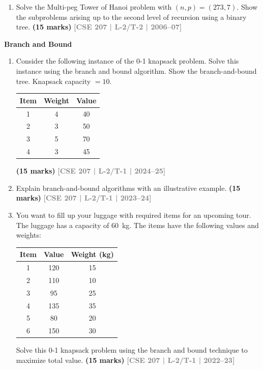 \documentclass[12pt,a3paper]{article}
\newcommand{\yr}[1]{\hfill\textcolor{gray}{\small\textbf{[#1]}}}
\newcommand{\mk}[1]{\textcolor{orange!70!black}{\small\textbf{(#1 marks)}}}
\newcommand{\subtopic}[2]{%
  \vspace{10pt}
  \noindent\begin{tcolorbox}[colback=#1!8,colframe=#1,boxrule=0.6pt,arc=4pt,
    left=6pt,right=6pt,top=4pt,bottom=4pt]
    \small\bfseries\textcolor{#1}{#2}
  \end{tcolorbox}
  \vspace{2pt}
}
\begin{document}
\begin{enumerate}
\item Solve the Multi-peg Tower of Hanoi problem with $(n, p) = (273, 7)$. Show the subproblems arising up to the second level of recursion using a binary tree. \mk{15}
\yr{CSE 207 | L-2/T-2 | 2006--07}




\end{enumerate}

\subtopic{cE}{Branch and Bound}
\label{sub:s5-branchbound}

\begin{enumerate}

\item Consider the following instance of the 0-1 knapsack problem. Solve this instance using the branch and bound algorithm. Show the branch-and-bound tree. Knapsack capacity $= 10$.
 
\begin{center}
\begin{tabular}{|c|c|c|}
\hline
\textbf{Item} & \textbf{Weight} & \textbf{Value} \\
\hline
1 & 4 & 40 \\
2 & 3 & 50 \\
3 & 5 & 70 \\
4 & 3 & 45 \\
\hline
\end{tabular}
\end{center}
\mk{15} \yr{CSE 207 | L-2/T-1 | 2024--25}

\item Explain branch-and-bound algorithms with an illustrative example.
\mk{15} \yr{CSE 207 | L-2/T-1 | 2023--24}

\item You want to fill up your luggage with required items for an upcoming tour. The luggage has a capacity of 60~kg. The items have the following values and weights:
 
\begin{center}
\begin{tabular}{|c|c|c|}
\hline
\textbf{Item} & \textbf{Value} & \textbf{Weight (kg)} \\
\hline
1 & 120 & 15 \\
2 & 110 & 10 \\
3 & 95  & 25 \\
4 & 135 & 35 \\
5 & 80  & 20 \\
6 & 150 & 30 \\
\hline
\end{tabular}
\end{center}
Solve this 0-1 knapsack problem using the branch and bound technique to maximize total value.
\mk{15} \yr{CSE 207 | L-2/T-1 | 2022--23}


\end{enumerate}
\end{document}
